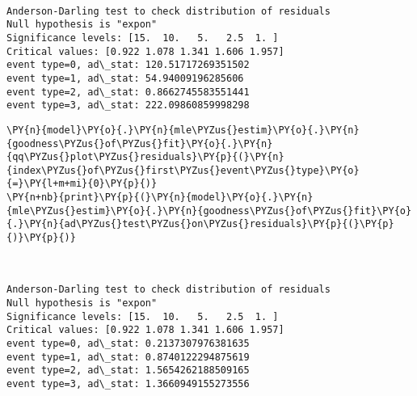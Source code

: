 \documentclass[10pt, article,table]{article}
\begin{document}
\begin{tcolorbox}[breakable, size=fbox, boxrule=.5pt, pad at break*=1mm, opacityfill=0]
\begin{center}
    \end{center}
    { \hspace*{\fill} \\}
    
    \begin{Verbatim}[commandchars=\\\{\}, fontsize=\small]
Anderson-Darling test to check distribution of residuals
Null hypothesis is "expon"
Significance levels: [15.  10.   5.   2.5  1. ]
Critical values: [0.922 1.078 1.341 1.606 1.957]
event type=0, ad\_stat: 120.51717269351502
event type=1, ad\_stat: 54.94009196285606
event type=2, ad\_stat: 0.8662745583551441
event type=3, ad\_stat: 222.09860859998298
    \end{Verbatim}
\end{tcolorbox}
\begin{tcolorbox}[breakable, size=fbox, boxrule=1pt, pad at break*=1mm,colback=cellbackground, colframe=cellborder]
\begin{Verbatim}[commandchars=\\\{\}, fontsize=\small]
\PY{n}{model}\PY{o}{.}\PY{n}{mle\PYZus{}estim}\PY{o}{.}\PY{n}{goodness\PYZus{}of\PYZus{}fit}\PY{o}{.}\PY{n}{qq\PYZus{}plot\PYZus{}residuals}\PY{p}{(}\PY{n}{index\PYZus{}of\PYZus{}first\PYZus{}event\PYZus{}type}\PY{o}{=}\PY{l+m+mi}{0}\PY{p}{)}
\PY{n+nb}{print}\PY{p}{(}\PY{n}{model}\PY{o}{.}\PY{n}{mle\PYZus{}estim}\PY{o}{.}\PY{n}{goodness\PYZus{}of\PYZus{}fit}\PY{o}{.}\PY{n}{ad\PYZus{}test\PYZus{}on\PYZus{}residuals}\PY{p}{(}\PY{p}{)}\PY{p}{)}
\end{Verbatim}
\end{tcolorbox}
\begin{tcolorbox}[breakable, size=fbox, boxrule=.5pt, pad at break*=1mm, opacityfill=0]
\begin{center}
    \end{center}
    { \hspace*{\fill} \\}
    
    \begin{Verbatim}[commandchars=\\\{\}, fontsize=\small]
Anderson-Darling test to check distribution of residuals
Null hypothesis is "expon"
Significance levels: [15.  10.   5.   2.5  1. ]
Critical values: [0.922 1.078 1.341 1.606 1.957]
event type=0, ad\_stat: 0.2137307976381635
event type=1, ad\_stat: 0.8740122294875619
event type=2, ad\_stat: 1.5654262188509165
event type=3, ad\_stat: 1.3660949155273556
    \end{Verbatim}
\end{tcolorbox}
\end{document}
